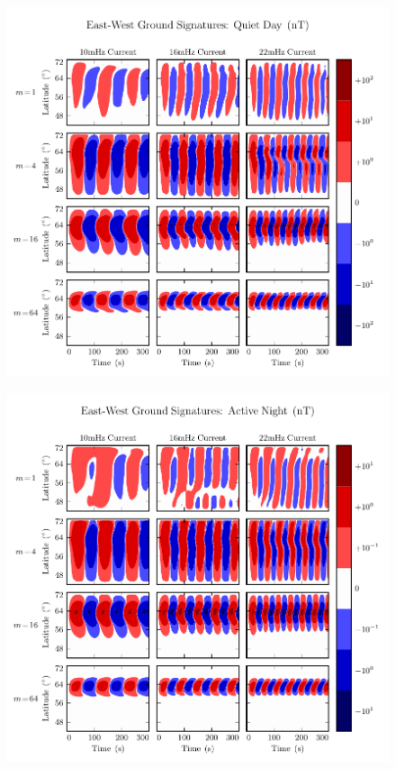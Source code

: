 \begin{figure}[H]
    \centering
    \includegraphics[width=\textwidth]{figures/BfE_J_2.pdf}
    \caption[East-West Ground Signatures: Quiet Day]{}
    \label{fig_BfE_J_2}
\end{figure}

\begin{figure}[H]
    \centering
    \includegraphics[width=\textwidth]{figures/BfE_J_3.pdf}
    \caption[East-West Ground Signatures: Active Night]{}
    \label{fig_BfE_J_3}
\end{figure}

